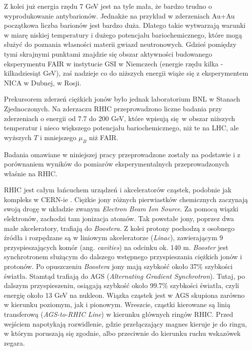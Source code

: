 \documentclass[a4paper,12pt]{article}
\begin{document}
Z kolei już energia rzędu 7 GeV jest na tyle mała, że bardzo trudno o wyprodukowanie antybarionów. Jednakże na przykład w zderzeniach Au+Au początkowa liczba barionów jest bardzo duża. Dlatego takie wytwarzają warunki w miarę niskiej temperatury i dużego potencjału bariochemicznego, które mogą służyć do poznania własności materii gwiazd neutronowych.
Gdzieś pomiędzy tymi skrajnymi punktami znajdzie się obszar aktywności budowanego eksperymentu FAIR w instytucie GSI w Niemczech (energie rzędu kilka - kilkadziesiąt GeV), zaś nadzieje co do niższych energii wiąże się z eksperymentem NICA w Dubnej, w Rosji.

Prekursorem zderzeń ciężkich jonów było jednak laboratorium BNL w Stanach Zjednoczonych. Na zderzaczu RHIC przeprowadzono liczne badania przy zderzeniach o energii od 7.7 do 200 GeV, które wpisują się w obszar niższych temperatur i nieco większego potencjału bariochemicznego, niż te na LHC, ale wyższych $T$ i mniejszego $\mu_B$ niż FAIR.

Badania omawiane w niniejszej pracy przeprowadzone zostały na podstawie i z porównaniem wyników do pomiarów eksperymentalnych przeprowadzonych właśnie na RHIC. 

RHIC jest całym łańcuchem urządzeń i akceleratorów cząstek, podobnie jak kompleks \quad \quad \quad w CERN-ie \cite{rhic-website}. Ciężkie jony różnych pierwiastków chemicznych zaczynają swoją drogę w układzie zwanym \textit{Electron Beam Ion Source}. Za pomocą wiązki elektronów, zachodzi tam jonizacja atomów. Tak powstałe jony, poprzez dwa małe akceleratory, trafiają do \textit{Boostera}. Z kolei protony pochodzą z osobnego źródła i rozpędzane są w liniowym akceleratorze (\textit{Linac}), zawierającym 9 przyspieszających komór (ang. \textit{cavities}) na odcinku ok. 140 m. \textit{Booster} jest synchrotronem służącym do dalszego wstępnego przyspieszania ciężkich jonów i protonów. Po opuszczeniu \quad \quad \textit{Boostera} jony mają szybkość około 37\% szybkości światła. Stamtąd trafiają do AGS (\textit{Alternating Gradient Synchrotron}). Tutaj, po dalszym przyspieszeniu, osiągają szybkość około 99.7\% szybkości światła, czyli energię około 13 GeV na nukleon. Wiązka cząstek jest w AGS skupiona zarówno w kierunku poziomym, jak i pionowym. Wreszcie, cząstki kierowane są linią transferową (\textit{AGS-to-RHIC Line}) w kierunku głównych ringów RHIC. Przed wejściem napotykają rozwidlenie, gdzie przełączający magnes kieruje je do ringu, w którym poruszają się zgodnie, albo przeciwnie do kierunku ruchu wskazówek zegara.
\end{document}
